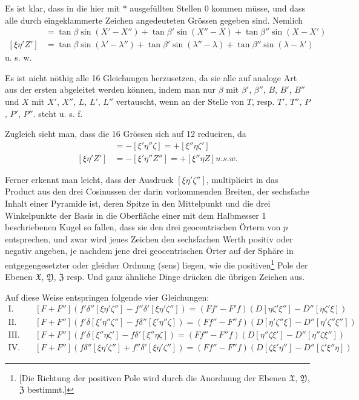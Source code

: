 \documentclass[10pt,a4paper]{article}
\begin{document}
Es ist klar, dass in die hier mit $*$ ausgefüllten Stellen $0$ kommen müsse, und dass alle durch eingeklammerte Zeichen angedeuteten Grössen gegeben sind. Nemlich
\begin{align*}
[\xi\eta'\zeta''] &= \tan\beta\sin(X' - X'') + \tan\beta'\sin(X'' - X) + \tan\beta''\sin(X - X')\\
[\xi\eta'Z'] &= \tan\beta\sin(\lambda' - \lambda'') + \tan\beta'\sin(\lambda'' - \lambda) + \tan\beta''\sin(\lambda - \lambda')
\end{align*}
u. s. w.

Es ist nicht nöthig alle 16 Gleichungen herzusetzen, da sie alle auf analoge Art aus der ersten abgeleitet werden können, indem man nur $\beta$ mit $\beta'$, $\beta''$, $B$, $B'$, $B''$ und $X$ mit $X'$, $X''$, $L$, $L'$, $L''$ vertauscht, wenn an der Stelle von $T$, resp. $T'$, $T''$, $P$, $P'$, $P''$. steht u. s. f.

\clearpage
\noindent
Zugleich sieht man, dass die 16 Grössen sich auf 12 reduciren, da
\begin{align*}
[\xi\eta'\zeta''] &= -[\xi'\eta''\zeta] = +[\xi''\eta\zeta'] \\
[\xi\eta'Z'] &= -[\xi'\eta''Z''] = +[\xi''\eta Z]
u. s. w.
\end{align*}

Ferner erkennt man leicht, dass der Ausdruck $[\xi\eta'\zeta'']$, multiplicirt in das Product aus den drei Cosinussen der darin vorkommenden Breiten, der sechsfache Inhalt einer Pyramide ist, deren Spitze in den Mittelpunkt und die drei Winkelpunkte der Basis in die Oberfläche einer mit dem Halbmesser 1 beschriebenen Kugel so fallen, dass sie den drei geocentrischen Örtern von $p$ entsprechen, und zwar wird jenes Zeichen den sechsfachen Werth positiv oder negativ angeben, je nachdem jene drei geocentrischen Örter auf der Sphäre in entgegengesetzter oder gleicher Ordnung (sens) liegen, wie die positiven\footnote{[Die Richtung der positiven Pole wird durch die Anordnung der Ebenen $\mathfrak{X}$, $\mathfrak{Y}$, $\mathfrak{Z}$ bestimmt.]} Pole der Ebenen $\mathfrak{X}$, $\mathfrak{Y}$, $\mathfrak{Z}$ resp. Und ganz ähnliche Dinge drücken die übrigen Zeichen aus.

Auf diese Weise entspringen folgende vier Gleichungen:
\begin{align*}
\text{I.}\quad &[F + F''](f'\delta''[\xi\eta'\zeta''] - f''\delta'[\xi\eta'\zeta'']) = (Ff' - F'f)(D[\eta\zeta'\xi''] - D''[\eta\zeta'\xi]) \\
\text{II.}\quad &[F + F''](f'\delta[\xi'\eta''\zeta''] - f\delta''[\xi'\eta''\zeta]) = (Ff'' - F''f)(D[\eta'\zeta''\xi] - D''[\eta'\zeta''\xi'']) \\
\text{III.}\quad &[F + F''](f'\delta[\xi''\eta\zeta'] - f\delta'[\xi''\eta\zeta]) = (Ff'' - F''f)(D[\eta''\zeta\xi'] - D''[\eta''\zeta\xi'']) \\
\text{IV.}\quad &[F + F''](f\delta''[\xi\eta'\zeta''] + f''\delta'[\xi\eta'\zeta'']) = (Ff'' - F''f)(D[\zeta\xi'\eta''] - D''[\zeta'\xi''\eta])
\end{align*}
\end{document}
